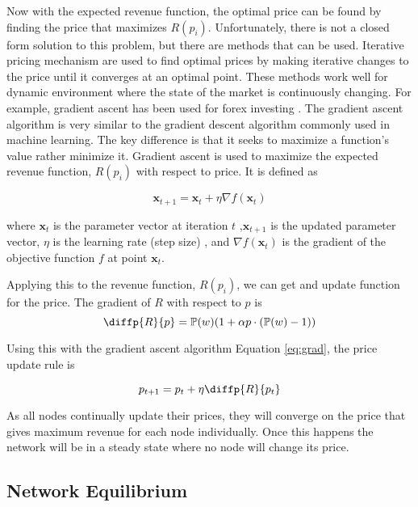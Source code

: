 \documentclass[preprint,twoside,11pt]{article}
\begin{document}
Now with the expected revenue function, the optimal price can be found by finding the price that maximizes $R(p_i)$.
Unfortunately, there is not a closed form solution to this problem, but there are methods that can be used.
Iterative pricing mechanism \citep{ecf80b8b-07bb-374f-ab3f-2cc6a349f689} are used to find optimal prices by making iterative changes to the price until it converges at an optimal point.
These methods work well for dynamic environment where the state of the market is continuously changing.
For example, gradient ascent has been used for forex investing \citep{su142215328}.
The gradient ascent algorithm is very similar to the gradient descent \citep{cauchy1847methode} algorithm commonly used in machine learning.
The key difference is that it seeks to maximize a function's value rather minimize it.
Gradient ascent is used to maximize the expected revenue function, $R(p_i)$ with respect to price.
It is defined as

\begin{equation}
	\mathbf{x}_{t+1} = \mathbf{x}_t + \eta \nabla f(\mathbf{x}_t)
	\label{eq:grad}
\end{equation}

where $\mathbf{x}_t$ is the parameter vector at iteration $t$
,$\mathbf{x}_{t+1}$ is the updated parameter vector,
$\eta$ is the learning rate (step size)
, and $\nabla f(\mathbf{x}_t)$ is the gradient of the objective function $f$ at point $\mathbf{x}_t$.

Applying this to the revenue function, $R(p_i)$, we can get and update function for the price.
The gradient of $R$ with respect to $p$ is
$$\diffp{R}{p} = \mathbb{P}(w)(1 + \alpha p \cdot (\mathbb{P}(w) - 1))$$

Using this with the gradient ascent algorithm Equation \ref{eq:grad}, the price update rule is

\begin{equation}
	p_{t+1} = p_t + \eta \diffp{R}{{p_t}}
	\label{eq:optim_price}
\end{equation}

As all nodes continually update their prices, they will converge on the price that gives
maximum revenue for each node individually. Once this happens the network will be in a steady state where
no node will change its price.

\subsection{Network Equilibrium}
\end{document}
